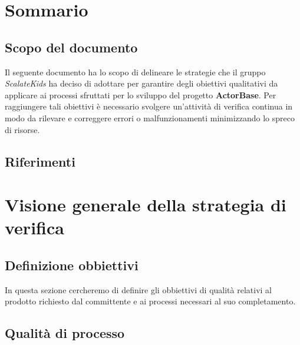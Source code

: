 \documentclass{scalatekids-article}
\begin{document}
\section{Sommario}
\subsection{Scopo del documento}
Il seguente documento ha lo scopo di delineare le strategie che il gruppo \textit{ScalateKids} ha deciso di adottare per garantire degli obiettivi qualitativi da applicare ai processi sfruttati per lo sviluppo del progetto \textbf{ActorBase}. Per raggiungere tali obiettivi è necessario svolgere un'attività di verifica continua in modo da rilevare e correggere errori o malfunzionamenti minimizzando lo spreco di risorse.
\prodPurpose
\glossExpl
\subsection{Riferimenti}
\newpage
\section{Visione generale della strategia di verifica}
\subsection{Definizione obbiettivi}
In questa sezione cercheremo di definire gli obbiettivi di qualità relativi al prodotto richiesto dal committente e ai processi necessari al suo completamento.
\subsection{Qualità di processo}
\end{document}
